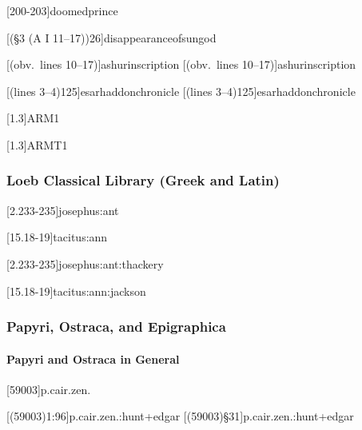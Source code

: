 \documentclass[a4paper]{article}
\begin{document}
[200-203]{doomedprince}

[(§3 \mkbibparens{A I 11--17})26]{disappearanceofsungod}

[(obv.\ lines 10--17)]{ashurinscription}
[(obv.\ lines 10--17)]{ashurinscription}

[(lines 3--4)125]{esarhaddonchronicle}
[(lines 3--4)125]{esarhaddonchronicle}

[1.3]{ARM1}

[1.3]{ARMT1}

\subsubsection{Loeb Classical Library (Greek and Latin)}

[2.233-235]{josephus:ant}

[15.18-19]{tacitus:ann}

[2.233-235]{josephus:ant:thackery}

[15.18-19]{tacitus:ann:jackson}


\subsubsection{Papyri, Ostraca, and Epigraphica}

\paragraph{Papyri and Ostraca in General}

[59003]{p.cair.zen.}

[(59003)1:96]{p.cair.zen.:hunt+edgar}
[(59003)§31]{p.cair.zen.:hunt+edgar}
\end{document}
